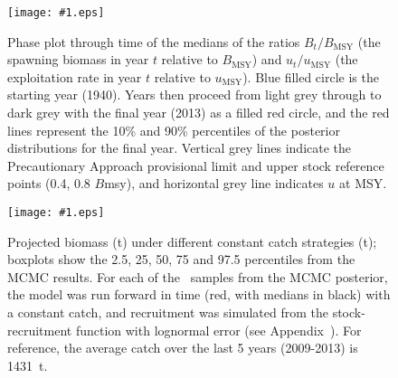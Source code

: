 \documentclass[11pt]{book}
\newcommand\onefig[2]{    %
  \begin{figure}[!htp]
  \begin{center}
	\texttt{[image: \#1.eps]} \\  %
  \end{center}
  \caption{#2 }
  \label{fig:#1} 
  \end{figure}
}
\begin{document}
\onefig{snail}{Phase plot through time of the medians of the ratios $B_t / B_\mathrm{MSY}$ (the spawning biomass in year $t$ relative to $B_\mathrm{MSY}$) and $u_t / u_\mathrm{MSY}$ (the exploitation rate in year $t$ relative to $u_\mathrm{MSY}$). Blue filled circle is the starting year (1940). Years then proceed from light grey through to dark grey with the final year (2013) as a filled red circle, and the red lines represent the 10\% and 90\% percentiles of the posterior distributions for the final year. Vertical grey lines indicate the Precautionary Approach provisional limit and upper stock reference points (0.4, 0.8 $B$msy), and horizontal grey line indicates $u$ at MSY.}%

\onefig{Bproj}{Projected biomass (t) under different constant catch strategies (t); boxplots show the 2.5, 25, 50, 75 and 97.5 percentiles from the MCMC results. For each of the \numMCMC~samples from the MCMC posterior, the model was run forward in time (red, with medians in black) with a constant catch, and recruitment was simulated from the stock-recruitment function with lognormal error (see Appendix~\eqnchapter). For reference, the average catch over the last 5 years (2009-2013) is 1431~t.}

\clearpage 

  

\clearpage     %
\end{document}
